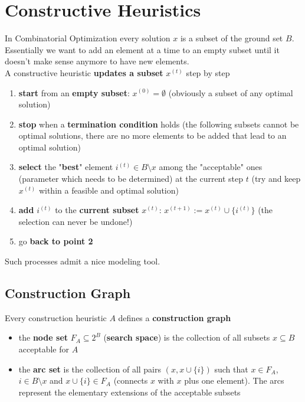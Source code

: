 \section{Constructive Heuristics}
In Combinatorial Optimization every solution $x$ is a subset of the ground set $B$.\\

Essentially we want to add an element at a time to an empty subset until it doesn't make sense anymore to have new elements.\\

A constructive heuristic \textbf{updates a subset} $x^{(t)}$ step by step
\begin{enumerate}
	\item \textbf{start} from an \textbf{empty subset}: $x^{(0)} = \emptyset$ (obviously a subset of any optimal solution)
	\item \textbf{stop} when a \textbf{termination condition} holds (the following subsets cannot be optimal solutions, there are no more elements to be added that lead to an optimal solution)
	\item \textbf{select} the "\textbf{best}" element $i^{(t)} \in B \setminus x$ among the "acceptable" ones (parameter which needs to be determined) at the current step $t$ (try and keep $x^{(t)}$ within a feasible and optimal solution)
	\item \textbf{add} $i^{(t)}$ to the \textbf{current subset} $x^{(t)}: \, x^{(t+1)} := x^{(t)} \cup \{i^{(t)}\}$ (the selection can never be undone!)
	\item go \textbf{back to point 2}
\end{enumerate}
Such processes admit a nice modeling tool.\\

\newpage

\subsection{Construction Graph}
Every construction heuristic $A$ defines a \textbf{construction graph}
\begin{itemize}
	\item the \textbf{node set} $F_A \subseteq 2^B$ (\textbf{search space}) is the collection of all subsets $x \subseteq B$ acceptable for $A$
	\item the \textbf{arc set} is the collection of all pairs $(x, x \cup \{i\})$ such that $x \in F_A$, $i \in B \setminus x$ and $x \cup \{i\} \in F_A$ (connects $x$ with $x$ plus one element). The arcs represent the elementary extensions of the acceptable subsets
\end{itemize}

